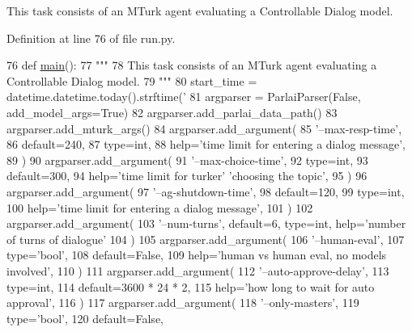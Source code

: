 \begin{DoxyVerb}This task consists of an MTurk agent evaluating a Controllable Dialog model.
\end{DoxyVerb}
 

Definition at line 76 of file run.\+py.


\begin{DoxyCode}
76 \textcolor{keyword}{def }\hyperlink{namespaceprojects_1_1wizard__of__wikipedia_1_1mturk__evaluation__task_1_1run_ad3ab2c71f8083c3112815c0b363d316b}{main}():
77     \textcolor{stringliteral}{"""}
78 \textcolor{stringliteral}{    This task consists of an MTurk agent evaluating a Controllable Dialog model.}
79 \textcolor{stringliteral}{    """}
80     start\_time = datetime.datetime.today().strftime(\textcolor{stringliteral}{'%
81     argparser = ParlaiParser(\textcolor{keyword}{False}, add\_model\_args=\textcolor{keyword}{True})
82     argparser.add\_parlai\_data\_path()
83     argparser.add\_mturk\_args()
84     argparser.add\_argument(
85         \textcolor{stringliteral}{'--max-resp-time'},
86         default=240,
87         type=int,
88         help=\textcolor{stringliteral}{'time limit for entering a dialog message'},
89     )
90     argparser.add\_argument(
91         \textcolor{stringliteral}{'--max-choice-time'},
92         type=int,
93         default=300,
94         help=\textcolor{stringliteral}{'time limit for turker'} \textcolor{stringliteral}{'choosing the topic'},
95     )
96     argparser.add\_argument(
97         \textcolor{stringliteral}{'--ag-shutdown-time'},
98         default=120,
99         type=int,
100         help=\textcolor{stringliteral}{'time limit for entering a dialog message'},
101     )
102     argparser.add\_argument(
103         \textcolor{stringliteral}{'--num-turns'}, default=6, type=int, help=\textcolor{stringliteral}{'number of turns of dialogue'}
104     )
105     argparser.add\_argument(
106         \textcolor{stringliteral}{'--human-eval'},
107         type=\textcolor{stringliteral}{'bool'},
108         default=\textcolor{keyword}{False},
109         help=\textcolor{stringliteral}{'human vs human eval, no models involved'},
110     )
111     argparser.add\_argument(
112         \textcolor{stringliteral}{'--auto-approve-delay'},
113         type=int,
114         default=3600 * 24 * 2,
115         help=\textcolor{stringliteral}{'how long to wait for auto approval'},
116     )
117     argparser.add\_argument(
118         \textcolor{stringliteral}{'--only-masters'},
119         type=\textcolor{stringliteral}{'bool'},
120         default=\textcolor{keyword}{False},
}
\end{DoxyCode}
